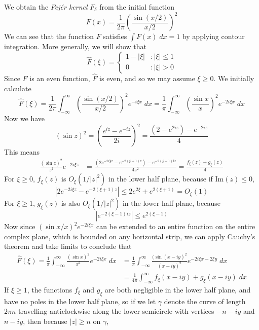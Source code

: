 \begin{example}
	We obtain the {\it Fej\'{e}r kernel} $F_\delta$ from the initial function
	\[ F(x) = \frac{1}{2\pi} \left( \frac{\sin(x/2)}{x/2} \right)^2 \]
	We can see that the function $F$ satisfies $\int F(x)\; dx = 1$ by applying contour integration. More generally, we will show that
	\[ \widehat{F}(\xi) = \begin{cases} 1 - |\xi| & : |\xi| \leq 1\\ 0 &: |\xi| > 0 \end{cases} \]
	Since $F$ is an even function, $\widehat{F}$ is even, and so we may assume $\xi \geq 0$. We initially calculate
	\[ \widehat{F}(\xi) = \frac{1}{2\pi} \int_{-\infty}^\infty \left( \frac{\sin(x/2)}{x/2} \right)^2 e^{- i \xi x}\; dx = \frac{1}{\pi} \int_{-\infty}^\infty \left( \frac{\sin x}{x} \right)^2 e^{- 2 i \xi x}\; dx \]
	Now we have
	\[ (\sin z)^2 = \left( \frac{e^{iz} - e^{-iz}}{2i} \right)^2 = \frac{(2 - e^{2iz}) - e^{-2iz}}{4} \]
	This means
	\begin{align*}
		\frac{(\sin z)^2}{z^2} e^{- 2 i \xi z} &= \frac{(2e^{-2 i \xi z} - e^{-2(\xi + 1) z}) - e^{-2(\xi - 1)iz}}{4z^2 } = \frac{f_\xi(z) + g_\xi(z)}{4}
	\end{align*}
	For $\xi \geq 0$, $f_\xi(z)$ is $O_\xi(1/|z|^2)$ in the lower half plane, because if $\text{Im}(z) \leq 0$,
	\[ |2e^{-2 i \xi z} - e^{-2(\xi + 1) z}| \leq 2e^{2 \xi} + e^{2(\xi + 1)} = O_\xi(1) \]
	For $\xi \geq 1$, $g_\xi(z)$ is also $O_\xi(1/|z|^2)$ in the lower half plane, because
	\[ |e^{-2(\xi - 1)iz}| \leq e^{2(\xi - 1)}  \]
	Now since $(\sin x/x)^2 e^{-2 i \xi x}$ can be extended to an entire function on the entire complex plane, which is bounded on any horizontal strip, we can apply Cauchy's theorem and take limits to conclude that
	\begin{align*}
		\widehat{F}(\xi) = \frac{1}{\pi} \int_{-\infty}^\infty \frac{(\sin x)^2}{x^2} e^{-2 i \xi x}\; dx &= \frac{1}{\pi} \int_{-\infty}^{\infty} \frac{(\sin (x - iy)^2}{(x - iy)^2} e^{-2i \xi x  -2 \xi y}\; dx\\
		&= \frac{1}{4 \pi} \int_{-\infty}^\infty f_\xi(x - iy) + g_\xi(x - iy)\; dx
	\end{align*}
	If $\xi \geq 1$, the functions $f_\xi$ and $g_\xi$ are both negligible in the lower half plane, and have no poles in the lower half plane, so if we let $\gamma$ denote the curve of length $2 \pi n$ travelling anticlockwise along the lower semicircle with vertices $-n - iy$ and $n - iy$, then because $|z| \geq n$ on $\gamma$,

\end{example}

